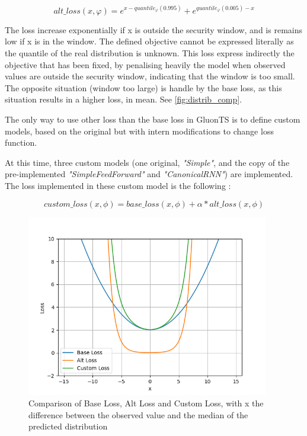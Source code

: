 \documentclass[a4paper, 12pt]{article}
\begin{document}
\begin{equation}
    alt\_loss(x,\varphi ) = e^{x - quantile_\varphi (0.995)} + e^{quantile_\varphi (0.005)-x}
\end{equation}


The loss increase exponentially if x is outside the security window, and is remains low if x is in the window.
The defined objective cannot be expressed literally as the quantile of the real distribution is unknown.
This loss express indirectly the objective that has been fixed, by penalising heavily the model when observed values are outside the security window, indicating that the window is too small. 
The opposite situation (window too large) is handle by the base loss, as this situation results in a higher loss, in mean.
See \ref{fig:distrib_comp}.


The only way to use other loss than the base loss in GluonTS is to define custom models, based on the original but with intern modifications to change loss function.

At this time, three custom models (one original, \textit{"Simple"}, and the copy of the pre-implemented \textit{"SimpleFeedForward"} and 
\textit{"CanonicalRNN"}) are implemented. The loss implemented in these custom model is the following :

\begin{equation}
    custom\_loss(x,\phi ) = base\_loss(x,\phi ) + \alpha * alt\_loss(x,\phi )
\end{equation}


\begin{figure}[!h]
    \centering
    \includegraphics[width=400px]{base_loss_vs_custom_loss.png}
    \caption{Comparison of Base Loss, Alt Loss and Custom Loss, with x the difference between the observed value and
    the median of the predicted distribution}
    \label{fig:customloss}
\end{figure}
\end{document}
